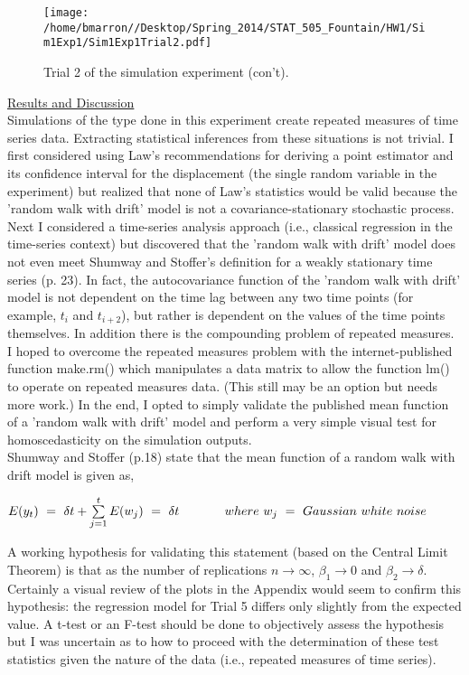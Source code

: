 \documentclass[a4paper,11pt]{article}
\begin{document}
\begin{figure}
\caption{Trial 2 of the simulation experiment (con't).}
    \texttt{[image: /home/bmarron//Desktop/Spring\_2014/STAT\_505\_Fountain/HW1/Sim1Exp1/Sim1Exp1Trial2.pdf]}
\end{figure}

\newpage
\underline{Results and Discussion}\\

Simulations of the type done in this experiment create repeated measures of time series data.  Extracting statistical inferences from these situations is not trivial. I first considered using Law's recommendations for deriving a point estimator and its confidence interval for the displacement (the single random variable in the experiment) but realized that none of Law's statistics would be valid because the 'random walk with drift' model is not a covariance-stationary stochastic process. Next I considered a time-series analysis approach (i.e., classical regression in the time-series context) but discovered that the 'random walk with drift' model does not even meet Shumway and Stoffer's definition for a weakly stationary time series (p. 23). In fact, the autocovariance function of the 'random walk with drift' model is not dependent on the time lag between any two time points (for example,  $ t_{i}$ and $ t_{i + 2}$), but rather is dependent on the values of the time points themselves. In addition there is the compounding problem of repeated measures.  I hoped to overcome the repeated measures problem with the internet-published function make.rm() which manipulates a data matrix to allow the function lm() to operate on repeated measures data. (This still may be an option but needs more work.) In the end, I opted to simply validate the published mean function of a 'random walk with drift' model and perform a very simple visual test for homoscedasticity on the simulation outputs.\\     

Shumway and Stoffer (p.18) state that the mean function of a random walk with drift model is given as,
\begin{center}
$ E(y_{t}) \ = \ \delta t + \sum\limits_{j=1}^{t} E(w_{j}) \ = \ \delta t \hspace{.5 in}where \  w_{j} \ = \ Gaussian \ white \ noise$
\end{center}
A working hypothesis for validating this statement (based on the Central Limit Theorem) is that as the number of replications $ n \longrightarrow \infty $, $ \beta _{1} \longrightarrow 0$ and $ \beta _{2} \longrightarrow \delta $.  Certainly a visual review of the plots in the Appendix would seem to confirm this hypothesis: the regression model for Trial 5 differs only slightly from the expected value. A t-test or an F-test should be done to objectively assess the hypothesis but I was uncertain as to how to proceed with the determination of these test statistics given the nature of the data (i.e., repeated measures of time series).\\
\end{document}
